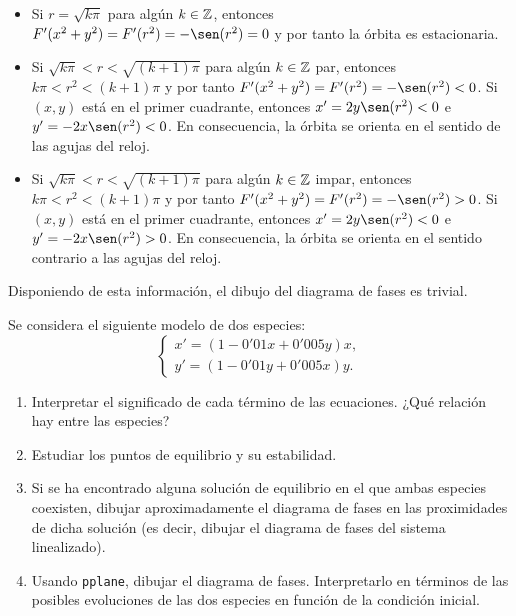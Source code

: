 \documentclass[11pt]{report}
\begin{document}
\begin{solution}
\begin{enumerate}
        \begin{itemize}
            \item Si $r = \sqrt{k\pi}$ para algún $k\in \mathbb Z$, entonces $F'(x^2+y^2) = F'(r^2) = -\sen(r^2) = 0$ y por tanto la órbita es estacionaria. 
            \item Si $\sqrt{k\pi} < r < \sqrt{(k+1)\pi}$ para algún $k \in \mathbb Z$ par, entonces $k\pi < r^2 <(k+1)\pi$ y por tanto $F'(x^2+y^2) = F'(r^2) = -\sen(r^2) < 0$. Si $(x,y)$ está en el primer cuadrante, entonces $x' = 2y\sen(r^2) < 0$ e $y' = -2x\sen(r^2) < 0$. En consecuencia, la órbita se orienta en el sentido de las agujas del reloj.
            \item Si $\sqrt{k\pi} < r < \sqrt{(k+1)\pi}$ para algún $k \in \mathbb Z$ impar, entonces $k\pi < r^2 <(k+1)\pi$ y por tanto $F'(x^2+y^2) = F'(r^2) = -\sen(r^2) > 0$. Si $(x,y)$ está en el primer cuadrante, entonces $x' = 2y\sen(r^2) < 0$ e $y' = -2x\sen(r^2) > 0$. En consecuencia, la órbita se orienta en el sentido contrario a las agujas del reloj.
        \end{itemize}
        Disponiendo de esta información, el dibujo del diagrama de fases es trivial.
    \end{enumerate}
\end{solution}

\begin{exercise}
    Se considera el siguiente modelo de dos especies:
    \[\begin{cases}
        x' = (1-0'01x+0'005y)x, \\
        y' = (1-0'01y+0'005x)y.
    \end{cases}\]
    \begin{enumerate}
        \item Interpretar el significado de cada término de las ecuaciones. ¿Qué relación hay entre las especies?
        \item Estudiar los puntos de equilibrio y su estabilidad.
        \item Si se ha encontrado alguna solución de equilibrio en el que ambas especies coexisten, dibujar aproximadamente el diagrama de fases en las proximidades de dicha solución (es decir, dibujar el diagrama de fases del sistema linealizado).
        \item Usando \texttt{pplane}, dibujar el diagrama de fases. Interpretarlo en términos de las posibles evoluciones de las dos especies en función de la condición inicial.
    \end{enumerate}
\end{exercise}
\end{document}
